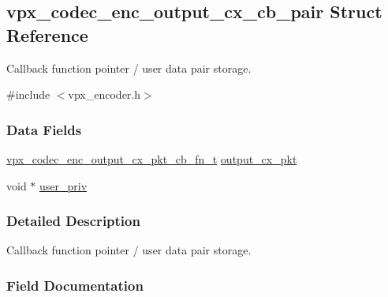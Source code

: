 \hypertarget{structvpx__codec__enc__output__cx__cb__pair}{}\subsection{vpx\+\_\+codec\+\_\+enc\+\_\+output\+\_\+cx\+\_\+cb\+\_\+pair Struct Reference}
\label{structvpx__codec__enc__output__cx__cb__pair}


Callback function pointer / user data pair storage.  




{\ttfamily \#include $<$vpx\+\_\+encoder.\+h$>$}

\subsubsection*{Data Fields}
\begin{DoxyCompactItemize}
\item 
\hyperlink{group__encoder_gaab1213b7c5f36eb382f736ab919767e6}{vpx\+\_\+codec\+\_\+enc\+\_\+output\+\_\+cx\+\_\+pkt\+\_\+cb\+\_\+fn\+\_\+t} \hyperlink{structvpx__codec__enc__output__cx__cb__pair_acd1d60f7b6f9f483c2092c69afe824a5}{output\+\_\+cx\+\_\+pkt}
\item 
void $\ast$ \hyperlink{structvpx__codec__enc__output__cx__cb__pair_abdb90f4a657b70be286327b091c8f70c}{user\+\_\+priv}
\end{DoxyCompactItemize}


\subsubsection{Detailed Description}
Callback function pointer / user data pair storage. 

\subsubsection{Field Documentation}
